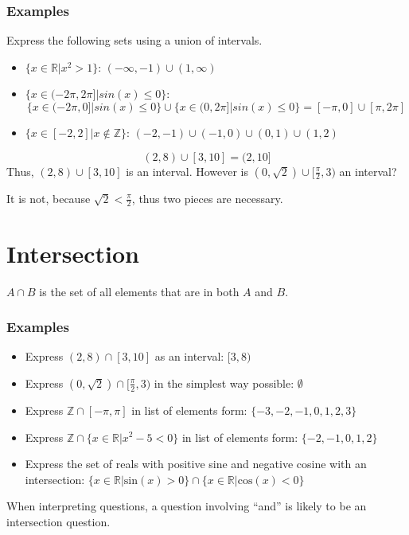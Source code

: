 \documentclass[12pt]{report}
\newcommand{\Z}{\mathbb{Z}}
\newcommand{\R}{\mathbb{R}}
\begin{document}
\begin{flushleft}
\subsubsection*{Examples}
Express the following sets using a union of intervals.
\begin{itemize}
\item \(\{x \in \R | x^2 > 1\}\): \((-\infty, -1) \cup (1, \infty)\)
\item \(\{x \in (-2\pi, 2\pi] | sin(x) \leq 0\}\): 
\[\{x \in (-2\pi, 0] | sin(x) \leq 0\} \cup \{x \in (0, 2\pi] | sin(x) \leq 0\}
= [-\pi, 0] \cup [\pi, 2\pi]\]
\item \(\{x \in [-2, 2] | x \notin \Z\}\): \((-2, -1) \cup (-1, 0) \cup (0, 1)
\cup (1, 2)\)
\end{itemize}

\[(2, 8) \cup [3, 10] = (2, 10]\]
Thus, \((2, 8) \cup [3, 10]\) is an interval. However is \((0, \sqrt{2}) \cup 
[\frac{\pi}{2}, 3)\) an interval?
\par
It is not, because \(\sqrt{2} < \frac{\pi}{2}\), thus two pieces are necessary.

\section*{Intersection}
\(A \cap B\) is the set of all elements that are in both \(A\) and \(B\).

\subsubsection*{Examples}
\begin{itemize}
    \item Express \((2, 8) \cap [3, 10]\) as an interval: \([3, 8)\)
    \item Express \((0, \sqrt{2}) \cap [\frac{\pi}{2}, 3)\) in the simplest way
    possible: \(\emptyset\)
    \item Express \(\Z \cap [-\pi, \pi]\) in list of elements form: 
    \(\{-3, -2, -1, 0, 1, 2, 3\}\)
    \item Express \(\Z \cap \{x \in \R | x^2 - 5 < 0\}\) in list of elements
    form: \(\{-2, -1, 0, 1, 2\}\)
    \item Express the set of reals with positive sine and negative cosine with
    an intersection: \(\{x \in \R | \mathrm{sin}(x) > 0\} \cap \{x \in \R | 
    \mathrm{cos}(x) < 0\}\)
\end{itemize}

When interpreting questions, a question involving ``and'' is likely to be an intersection question.


\end{flushleft}
\end{document}
